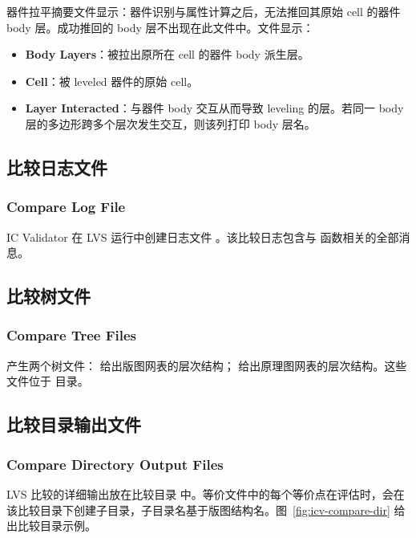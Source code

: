 器件拉平摘要文件显示：器件识别与属性计算之后，无法推回其原始 cell 的器件 body 层。成功推回的 body 层不出现在此文件中。文件显示：
\begin{itemize}
  \item \textbf{Body Layers}：被拉出原所在 cell 的器件 body 派生层。
  \item \textbf{Cell}：被 leveled 器件的原始 cell。
  \item \textbf{Layer Interacted}：与器件 body 交互从而导致 leveling 的层。若同一 body 层的多边形跨多个层次发生交互，则该列打印 body 层名。
\end{itemize}

\subsection{比较日志文件}
\subsubsection*{Compare Log File}

IC Validator 在 LVS 运行中创建日志文件 。该比较日志包含与  函数相关的全部消息。

\subsection{比较树文件}
\subsubsection*{Compare Tree Files}

 产生两个树文件： 给出版图网表的层次结构； 给出原理图网表的层次结构。这些文件位于  目录。

\subsection{比较目录输出文件}
\subsubsection*{Compare Directory Output Files}

LVS 比较的详细输出放在比较目录  中。等价文件中的每个等价点在评估时，会在该比较目录下创建子目录，子目录名基于版图结构名。图~\ref{fig:icv-compare-dir} 给出比较目录示例。


